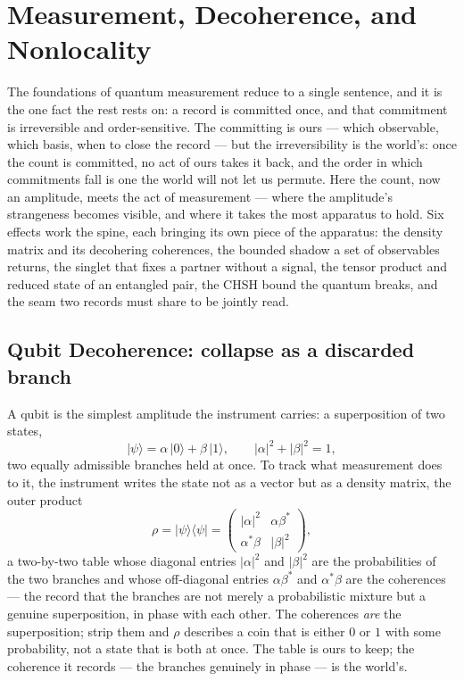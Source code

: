 \chapter{Measurement, Decoherence, and Nonlocality}
\label{chap:measurement-decoherence-nonlocality}

The foundations of quantum measurement reduce to a single sentence, and it is the one fact the rest rests on: a
record is committed once, and that commitment is irreversible and order-sensitive. The committing is ours ---
which observable, which basis, when to close the record --- but the irreversibility is the world's: once the
count is committed, no act of ours takes it back, and the order in which commitments fall is one the world will
not let us permute. Here the count, now an amplitude, meets the act of measurement --- where the amplitude's
strangeness becomes visible, and where it takes the most apparatus to hold. Six effects work the spine, each
bringing its own piece of the apparatus: the density matrix and its decohering coherences, the bounded shadow a
set of observables returns, the singlet that fixes a partner without a signal, the tensor product and reduced
state of an entangled pair, the CHSH bound the quantum breaks, and the seam two records must share to be
jointly read.

\section{Qubit Decoherence: collapse as a discarded branch}
\label{se:decoherence}

A qubit is the simplest amplitude the instrument carries: a superposition of two states,
\begin{equation}
  \lvert\psi\rangle = \alpha\,\lvert 0\rangle + \beta\,\lvert 1\rangle, \qquad |\alpha|^2 + |\beta|^2 = 1,
\end{equation}
two equally admissible branches held at once. To track what measurement does to it, the instrument writes the
state not as a vector but as a density matrix, the outer product
\begin{equation}
  \rho = \lvert\psi\rangle\langle\psi\rvert =
  \begin{pmatrix} |\alpha|^2 & \alpha\beta^* \\ \alpha^*\beta & |\beta|^2 \end{pmatrix},
\end{equation}
a two-by-two table whose diagonal entries $|\alpha|^2$ and $|\beta|^2$ are the probabilities of the two
branches and whose off-diagonal entries $\alpha\beta^*$ and $\alpha^*\beta$ are the coherences --- the record
that the branches are not merely a probabilistic mixture but a genuine superposition, in phase with each
other. The coherences \emph{are} the superposition; strip them and $\rho$ describes a coin that is either $0$
or $1$ with some probability, not a state that is both at once. The table is ours to keep; the coherence it
records --- the branches genuinely in phase --- is the world's.

